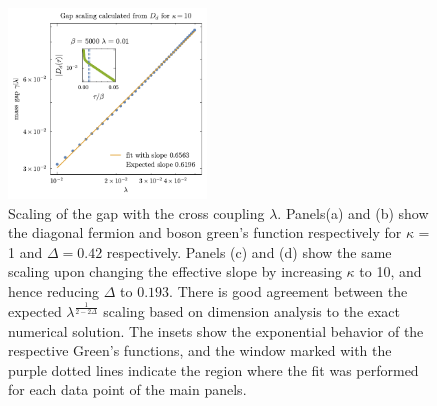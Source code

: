 \begin{figure}[t!]
        \includegraphics[width=0.47\textwidth]{figures/chapter3/kappa10DdGapscalingv2.pdf}
    \caption{Scaling of the gap with the cross coupling $\lambda$. Panels(a) and (b) show the diagonal fermion and boson green's function respectively for $\kappa$ = 1 and $\Delta = 0.42$ respectively. Panels (c) and (d) show the same scaling upon changing the effective slope by increasing $\kappa$ to 10, and hence reducing $\Delta$ to $0.193$. There is good agreement between the expected $\lambda^{\frac{1}{2-2\Delta}}$ scaling based on dimension analysis to the exact numerical solution. The insets show the exponential behavior of the respective Green's functions, and the window marked with the purple dotted lines indicate the region where the fit was performed for each data point of the main panels.}
    \label{fig:ImagTimeScaling}
\end{figure}
%

